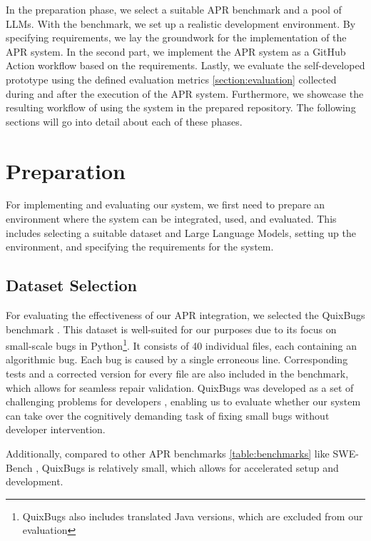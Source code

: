 In the preparation phase, we select a suitable APR benchmark and a pool of \acp{LLM}. With the benchmark, we set up a realistic development environment. By specifying requirements, we lay the groundwork for the implementation of the APR system.
In the second part, we implement the APR system as a GitHub Action workflow based on the requirements.
Lastly, we evaluate the self-developed prototype using the defined evaluation metrics \ref{section:evaluation} collected during and after the execution of the APR system. Furthermore, we showcase the resulting workflow of using the system in the prepared repository.
The following sections will go into detail about each of these phases.

\section{Preparation}

For implementing and evaluating our system, we first need to prepare an environment where the system can be integrated, used, and evaluated. This includes selecting a suitable dataset and Large Language Models, setting up the environment, and specifying the requirements for the system.

\subsection{Dataset Selection}

For evaluating the effectiveness of our APR integration, we selected the QuixBugs benchmark \cite{linQuixBugsMultilingualProgram2017}. This dataset is well-suited for our purposes due to its focus on small-scale bugs in Python\footnote{QuixBugs also includes translated Java versions, which are excluded from our evaluation}. It consists of 40 individual files, each containing an algorithmic bug. Each bug is caused by a single erroneous line. Corresponding tests and a corrected version for every file are also included in the benchmark, which allows for seamless repair validation. QuixBugs was developed as a set of challenging problems for developers \cite{linQuixBugsMultilingualProgram2017}, enabling us to evaluate whether our system can take over the cognitively demanding task of fixing small bugs without developer intervention.

Additionally, compared to other APR benchmarks \ref{table:benchmarks} like SWE-Bench \cite{jimenezSWEbenchCanLanguage2024}, QuixBugs is relatively small, which allows for accelerated setup and development.

